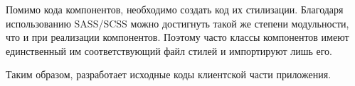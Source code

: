 Помимо кода компонентов, необходимо создать код их стилизации. Благодаря использованию SASS/SCSS можно достигнуть такой же степени модульности, что и при реализации компонентов. Поэтому часто классы компонентов имеют единственный им соответствующий файл стилей и импортируют лишь его.

Таким образом, разработает исходные коды клиентской части приложения. 
